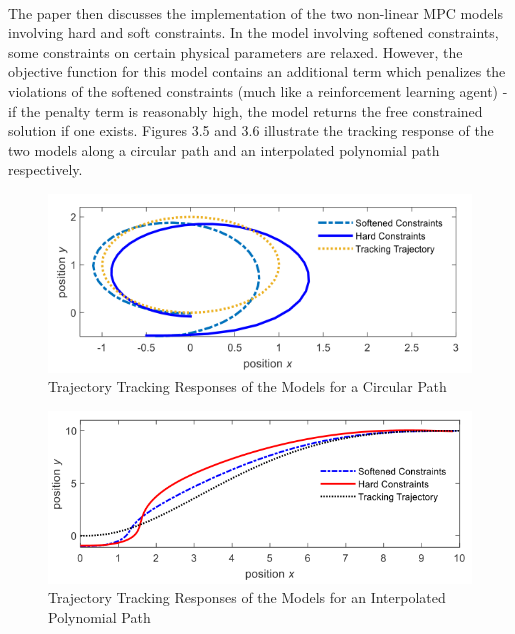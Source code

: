 \paragraph{}
The paper then discusses the implementation of the two non-linear MPC models involving hard and soft constraints. In the model involving softened constraints, some constraints on certain physical parameters are relaxed. However, the objective function for this model contains an additional term which penalizes the violations of the softened constraints (much like a reinforcement learning agent) - if the penalty term is reasonably high, the model returns the free constrained solution if one exists. Figures 3.5 and 3.6 illustrate the tracking response of the two models along a circular path and an interpolated polynomial path respectively.

\begin{figure}[H]\label{fig3.5}
\centering \includegraphics[scale=1]{Images/paper3_circular_path_tracking.png}
\caption{Trajectory Tracking Responses of the Models for a Circular Path}
\end{figure}

\begin{figure}[H]\label{fig3.6}
\centering \includegraphics[scale=0.92]{Images/paper3_trajectory_tracking.png}
\caption{Trajectory Tracking Responses of the Models for an Interpolated Polynomial Path}
\end{figure}

